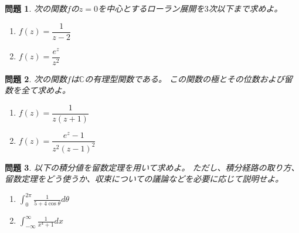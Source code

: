 \documentclass{ltjsarticle}
\newtheorem{prob}{問題}
\begin{document}
\begin{prob}
    次の関数$f$の$z=0$を中心とするローラン展開を$3$次以下まで求めよ。
    \begin{multicols}{2}
        \begin{enumerate}
            \item $f(z)=\dfrac{1}{z-2}$
            \item $f(z)=\dfrac{e^z}{z^2}$
        \end{enumerate}
    \end{multicols}
\end{prob}

\begin{prob}
    次の関数$f$は$\mathbb{C}$の有理型関数である。
    この関数の極とその位数および留数を全て求めよ。
    \begin{multicols}{2}
        \begin{enumerate}
            \item $f(z)=\dfrac{1}{z(z+1)}$
            \item $f(z)=\dfrac{e^z-1}{z^2(z-1)^2}$
        \end{enumerate}
    \end{multicols}
\end{prob}

\begin{prob}
    以下の積分値を留数定理を用いて求めよ。
    ただし、積分経路の取り方、留数定理をどう使うか、収束についての議論などを必要に応じて説明せよ。
    \begin{multicols}{2}
        \begin{enumerate}
            \item $\displaystyle\int^{2\pi}_0\frac{1}{5+4\cos\theta}d\theta$
            \item $\displaystyle\int^\infty_{-\infty}\frac{1}{x^4+1}dx$
        \end{enumerate}
    \end{multicols}
\end{prob}
\end{document}
